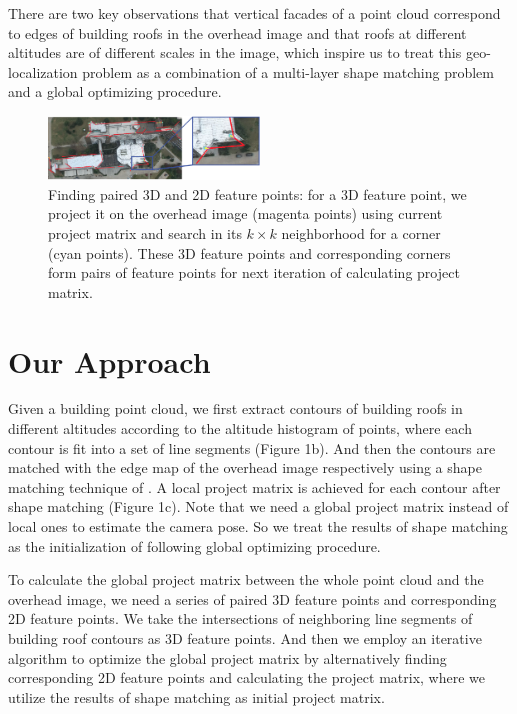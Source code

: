 There are two key observations that vertical facades of a point cloud correspond to edges of building roofs in the overhead image and that roofs at different altitudes are of different scales in the image, which inspire us to treat this geo-localization problem as a combination of a multi-layer shape matching problem and a global optimizing procedure. 
%
\begin{figure}
	\centering
	\vspace{2.0cm}
	\includegraphics[width=0.5\textwidth]{figures/details_png}
	\caption{Finding paired 3D and 2D feature points: for a 3D feature point, we project it on the overhead image (magenta points) using current project matrix and search in its $k\times k$ neighborhood for a corner (cyan points). These 3D feature points and corresponding corners form pairs of feature points for next iteration of calculating project matrix.}
	\label{fig:overview}
\end{figure}
\section{Our Approach}
Given a building point cloud, we first extract contours of building roofs in different altitudes according to the altitude histogram of points, where each contour is fit into a set of line segments (Figure 1b). And then the contours are matched with the edge map of the overhead image respectively using a shape matching technique of \cite{FDCM}. A local project matrix is achieved for each contour after shape matching (Figure 1c). Note that we need a global project matrix instead of local ones to estimate the camera pose. So we treat the results of shape matching as the initialization of following global optimizing procedure. 

To calculate the global project matrix between the whole point cloud and the overhead image, we need a series of paired 3D feature points and corresponding 2D feature points. We take the intersections of neighboring line segments of building roof contours as 3D feature points. And then we employ an iterative algorithm to optimize the global project matrix by alternatively finding corresponding 2D feature points and calculating the project matrix, where we utilize the results of shape matching as initial project matrix.

